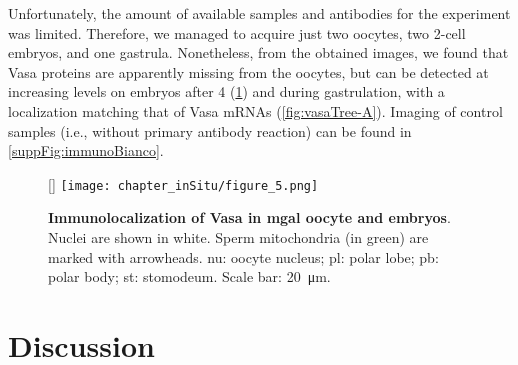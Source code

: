 Unfortunately, the amount of available samples and antibodies for the experiment was limited. Therefore, we managed to acquire just two oocytes, two 2-cell embryos, and one gastrula. Nonetheless, from the obtained images, we found that Vasa proteins are apparently missing from the oocytes, but can be detected at increasing levels on embryos after \qty{4}{\hpf} (\cref{fig:immuno}) and during gastrulation, with a localization matching that of Vasa mRNAs (\cref{fig:vasaTree-A}). Imaging of control samples (i.e., without primary antibody reaction) can be found in \cref{suppFig:immunoBianco}.

\begin{figure}
	[\FBwidth]
	{\texttt{[image: chapter\_inSitu/figure\_5.png]}}
	{\caption[\textbf{Immunolocalization of Vasa in \gls{mgal} oocyte and embryos}]
	{
		\textbf{Immunolocalization of Vasa in \gls{mgal} oocyte and embryos}. Nuclei are shown in white. Sperm mitochondria (in green) are marked with arrowheads. nu: oocyte nucleus; pl: polar lobe; pb: polar body; st: stomodeum. Scale bar: \qty{20}{\um}.
	}
	\label{fig:immuno}}
\end{figure}

\section{Discussion} \label{chapter:insitu-discussion}
